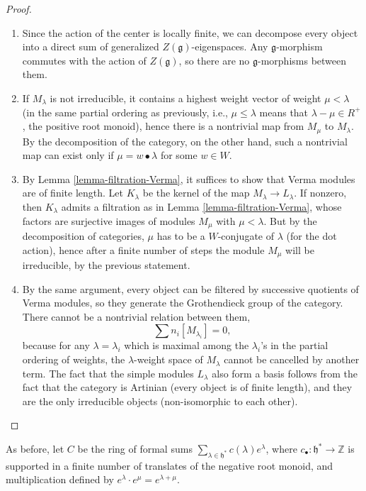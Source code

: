 \begin{proof}
 \begin{enumerate}
  \item Since the action of the center is locally finite, we can decompose every object into a direct sum of generalized $Z(\mathfrak g)$-eigenspaces. Any $\mathfrak g$-morphism commutes with the action of $Z(\mathfrak g)$, so there are no $\mathfrak g$-morphisms between them.
  \item If $M_\lambda$ is not irreducible, it contains a highest weight vector of weight $\mu<\lambda$ (in the same partial ordering as previously, i.e., $\mu\le \lambda$ means that $\lambda -\mu \in R^+$, the positive root monoid), hence there is a nontrivial map from $M_\mu$ to $M_\lambda$. By the decomposition of the category, on the other hand, such a nontrivial map can exist only if $\mu=w\bullet \lambda$ for some $w\in W$.
  \item By Lemma \ref{lemma-filtration-Verma}, it suffices to show that Verma modules are of finite length. Let $K_\lambda$ be the kernel of the map $M_\lambda\to L_\lambda$.
If nonzero, then $K_\lambda$ admits a filtration as in Lemma \ref{lemma-filtration-Verma}, whose factors are surjective images of modules $M_\mu$ with $\mu<\lambda$. But by the decomposition of categories, $\mu$ has to be a $W$-conjugate of $\lambda$ (for the dot action), hence after a finite number of steps the module $M_\mu$ will be irreducible, by the previous statement. 
  \item By the same argument, every object can be filtered by successive quotients of Verma modules, so they generate the Grothendieck group of the category. There cannot be a nontrivial relation between them,
  $$ \sum n_i [M_{\lambda_i}]=0,$$
because for any $\lambda=\lambda_i$ which is maximal among the $\lambda_i$'s in the partial ordering of weights, the $\lambda$-weight space of $M_\lambda$ cannot be cancelled by another term. The fact that the simple modules $L_\lambda$ also form a basis follows from the fact that the category is Artinian (every object is of finite length), and they are the only irreducible objects (non-isomorphic to each other). 
\end{enumerate}
\end{proof}


As before, let $C$ be the ring of formal sums $\sum_{\lambda\in \mathfrak h^*} c(\lambda) e^\lambda$, where $c_\bullet: \mathfrak h^*\to \mathbb Z$ is supported in a finite number of translates of the negative root monoid, and multiplication defined by $e^\lambda \cdot e^\mu = e^{\lambda+\mu}$. 

